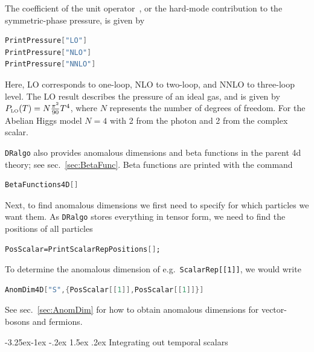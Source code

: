 \documentclass[11pt]{article}
\makeatletter
\def\dralgo{{\tt DRalgo}}
\newcommand{\rmii}[1]{{\mbox{\tiny\rm{#1}}}}
\renewcommand\subsection{\@startsection{subsection}{2}{\z@}%
  {-3.25ex\@plus -1ex \@minus -.2ex}%
  {1.5ex \@plus .2ex}%
  {\normalfont\normalsize\bfseries}}
\makeatother
\begin{document}
The coefficient of the unit operator~\cite{Braaten:1995cm},
or the hard-mode contribution to the symmetric-phase pressure, is given by
\begin{lstlisting}[language=Mathematica,mathescape=true]
PrintPressure["LO"]
PrintPressure["NLO"]
PrintPressure["NNLO"]
\end{lstlisting}
Here,
LO corresponds to one-loop,
NLO to two-loop, and
NNLO to three-loop level.
The LO result describes the pressure of an ideal gas, and is given by
$P_{\rmii{LO}}(T) = N \frac{\pi^2}{90} T^4$, where
$N$ represents the number of degrees of freedom.
For the Abelian Higgs model
$N=4$ with
2 from the photon and
2 from the complex scalar.

\dralgo{} also provides anomalous dimensions and beta functions in
the parent 4d theory; see sec.~\ref{sec:BetaFunc}.
Beta functions are printed with the command
\begin{lstlisting}[language=Mathematica,mathescape=true]
BetaFunctions4D[]
\end{lstlisting}

Next, to find anomalous dimensions we first need to specify for which particles we want them.
As \dralgo{} stores everything in tensor form, we need to find the positions of all particles
\begin{lstlisting}[language=Mathematica,mathescape=true]
PosScalar=PrintScalarRepPositions[];
\end{lstlisting}
To determine the anomalous dimension of e.g.\ {\tt ScalarRep[[1]]},
we would write
\begin{lstlisting}[language=Mathematica,mathescape=true]
AnomDim4D["S",{PosScalar[[1]],PosScalar[[1]]}]
\end{lstlisting}
See sec.~\ref{sec:AnomDim}
for how to obtain anomalous dimensions for vector-bosons and fermions.


\subsection{Integrating out temporal scalars}
\label{sec:temporal}
\end{document}
